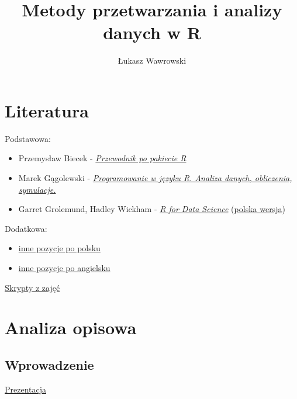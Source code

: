 \documentclass[
]{book}
\title{Metody przetwarzania i analizy danych w R}
\author{Łukasz Wawrowski}
\date{}
\providecommand{\tightlist}{%
  \setlength{\itemsep}{0pt}\setlength{\parskip}{0pt}}
\begin{document}
\maketitle

{
\setcounter{tocdepth}{1}
\tableofcontents
}
\hypertarget{literatura}{%
\chapter*{Literatura}\label{literatura}}

Podstawowa:

\begin{itemize}
\tightlist
\item
  Przemysław Biecek - \href{http://pbiecek.github.io/Przewodnik/}{\emph{Przewodnik po pakiecie R}}
\item
  Marek Gągolewski - \href{http://www.gagolewski.com/publications/programowanier/}{\emph{Programowanie w języku R. Analiza danych, obliczenia, symulacje.}}
\item
  Garret Grolemund, Hadley Wickham - \href{http://r4ds.had.co.nz/}{\emph{R for Data Science}} (\href{https://helion.pl/ksiazki/jezyk-r-kompletny-zestaw-narzedzi-dla-analitykow-danych-hadley-wickham-garrett-grolemund,jezrko.htm}{polska wersja})
\end{itemize}

Dodatkowa:

\begin{itemize}
\tightlist
\item
  \href{https://github.com/mi2-warsaw/SER/blob/master/histoRia/README.md}{inne pozycje po polsku}
\item
  \href{https://bookdown.org/}{inne pozycje po angielsku}
\end{itemize}

\href{https://github.com/lwawrowski/cdv_bigdata}{Skrypty z zajęć}

\hypertarget{analiza-opisowa}{%
\chapter{Analiza opisowa}\label{analiza-opisowa}}

\hypertarget{wprowadzenie}{%
\section{Wprowadzenie}\label{wprowadzenie}}

\href{presentations/01_eda.html}{Prezentacja}
\end{document}

